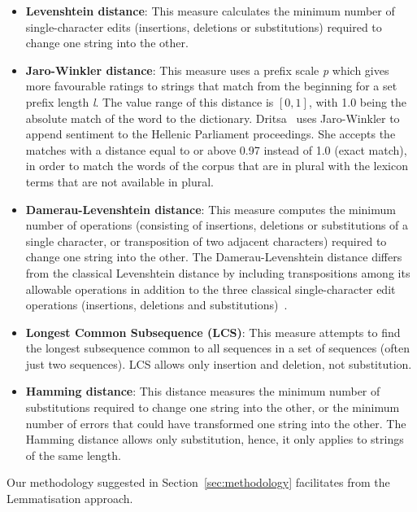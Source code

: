 \begin{itemize}
 \begin{itemize}
  \item \textbf{Levenshtein distance}:
  This measure calculates the minimum number of single-character edits
  (insertions, deletions or substitutions) required to change one string
  into the other.
  
  \item \textbf{Jaro-Winkler distance}:
  This measure uses a prefix scale \emph{p}
  which gives more favourable ratings to strings
  that match from the beginning for a set prefix length \emph{l}.
  The value range of this distance is $[0,1]$,
  with 1.0 being the absolute match of the word to the dictionary.
  Dritsa~\cite{Dri18} uses Jaro-Winkler
  to append sentiment to the Hellenic Parliament proceedings.
  She accepts the matches with a distance equal to or above 0.97 instead of 1.0
  (exact match), in order to match the words of the corpus that are in plural
  with the lexicon terms that are not available in plural.
  
  \item \textbf{Damerau-Levenshtein distance}:
  This measure computes the minimum number of operations
  (consisting of insertions, deletions or substitutions of a single character,
  or transposition of two adjacent characters)
  required to change one string into the other.
  The Damerau-Levenshtein distance differs from the classical Levenshtein distance
  by including transpositions among its allowable operations
  in addition to the three classical single-character edit operations
  (insertions, deletions and substitutions)~\cite{Bar07,Lev66}.
  
  \item \textbf{Longest Common Subsequence (LCS)}:
  This measure attempts to find the longest subsequence common to all sequences
  in a set of sequences (often just two sequences).
  LCS allows only insertion and deletion, not substitution.
  
  \item \textbf{Hamming distance}:
  This distance measures the minimum number of substitutions
  required to change one string into the other,
  or the minimum number of errors that could have transformed one string into the other.
  The Hamming distance allows only substitution,
  hence, it only applies to strings of the same length.
  \end{itemize}
 
\end{itemize}

Our methodology suggested in Section~\ref{sec:methodology} facilitates
from the Lemmatisation approach.

